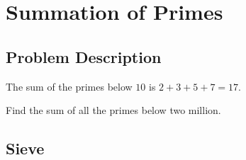\chapter{Summation of Primes}
\section{Problem Description}
The sum of the primes below $10$ is $2 + 3 + 5 + 7 = 17$.

Find the sum of all the primes below two million.

\section{Sieve}

